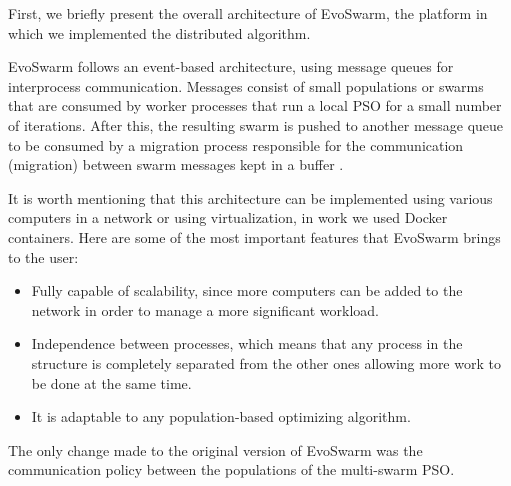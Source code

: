 \documentclass[runningheads]{llncs}
\begin{document}
First, we briefly present the overall architecture of EvoSwarm, the
platform in which we implemented the distributed algorithm.

EvoSwarm follows an event-based architecture, using message queues for
interprocess communication. Messages consist of small populations or swarms that
are consumed by worker processes that run a local PSO for a small number of
iterations. After this, the resulting swarm is pushed to another message queue
to be consumed by a migration process responsible for the communication
(migration) between swarm messages kept in a buffer \cite{b18}.



It is worth mentioning that this architecture can be implemented using various
computers in a network or using virtualization, in work we used Docker containers. 
Here are some of the most important features that
EvoSwarm brings to the user:

\begin{itemize} 
  
  \item Fully capable of scalability, since more computers can be added to the
  network in order to manage a more significant workload.
    
    \item Independence between processes, which means that any process in the
    structure is completely separated from the other ones allowing more work to
    be done at the same time.
    
    \item It is adaptable to any population-based optimizing algorithm.
\end{itemize}

The only change made to the original version of EvoSwarm \cite{b18} was the
communication policy between the populations of the multi-swarm PSO. %
\end{document}
